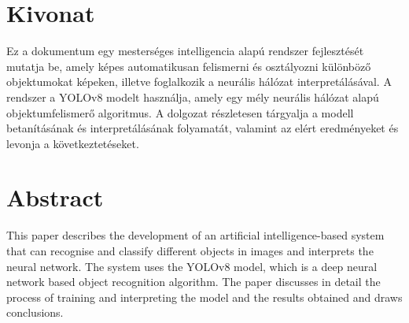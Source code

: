 \setcounter{page}{1}

\selecthungarian

\chapter*{Kivonat}

Ez a dokumentum egy mesterséges intelligencia alapú rendszer fejlesztését mutatja be, amely képes automatikusan
felismerni és osztályozni különböző objektumokat képeken, illetve foglalkozik a neurális hálózat interpretálásával.
A rendszer a YOLOv8 modelt használja, amely egy mély neurális hálózat alapú objektumfelismerő algoritmus.
A dolgozat részletesen tárgyalja a modell betanításának és interpretálásának folyamatát, valamint az elért eredményeket
és levonja a következtetéseket.

\vfill
\selectenglish

\chapter*{Abstract}

This paper describes the development of an artificial intelligence-based system that can
recognise and classify different objects in images and interprets the neural network.
The system uses the YOLOv8 model, which is a deep neural network based object recognition algorithm.
The paper discusses in detail the process of training and interpreting the model and the results obtained
and draws conclusions.

\vfill
\cleardoublepage

\selectthesislanguage

\setcounter{romanPage}{\value{page}}

